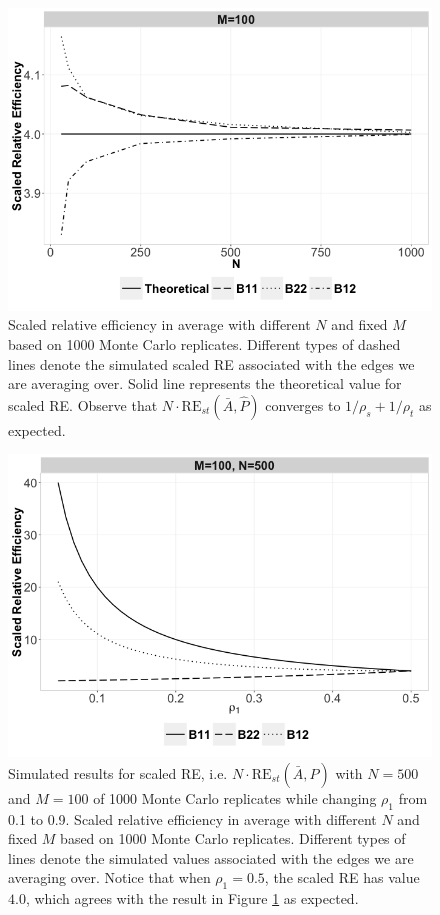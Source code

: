 \documentclass[a4paper]{article}
\begin{document}
\begin{figure}[!htb]
	\centering
	\includegraphics[width=1\textwidth]{RE.png}
	\caption{Scaled relative efficiency in average with different $N$ and fixed $M$ based on 1000 Monte Carlo replicates. Different types of dashed lines denote the simulated scaled RE associated with the edges we are averaging over. Solid line represents the theoretical value for scaled RE. Observe that $N \cdot \mathrm{RE}_{st}(\bar{A}, \hat{P})$ converges to $1/\rho_s + 1/\rho_t$ as expected.}
	\label{fig:RE}
\end{figure}

\begin{figure}[!htb]
\centering
\includegraphics[width=1\textwidth]{Rho.png}
\caption{Simulated results for scaled RE, i.e. $N \cdot \mathrm{RE}_{st}(\bar{A}, \hat{P})$ with $N = 500$ and $M = 100$ of 1000 Monte Carlo replicates while changing $\rho_1$ from 0.1 to 0.9. Scaled relative efficiency in average with different $N$ and fixed $M$ based on 1000 Monte Carlo replicates. Different types of lines denote the simulated values associated with the edges we are averaging over. Notice that when $\rho_1 = 0.5$, the scaled RE has value $4.0$, which agrees with the result in Figure \ref{fig:RE} as expected.}
\label{fig:RErho}
\end{figure}
\end{document}
